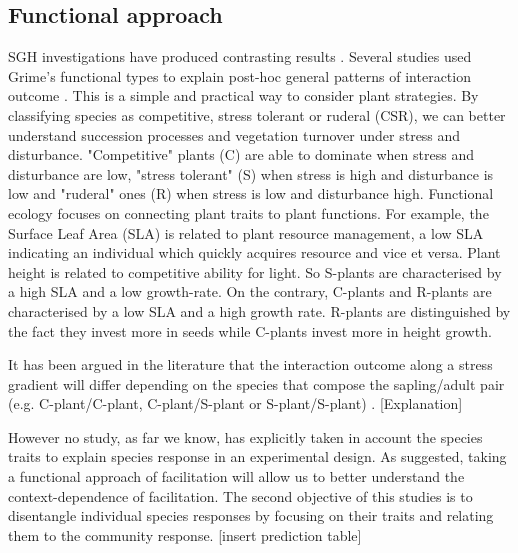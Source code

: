 \documentclass[12pt]{article} %
\begin{document}
\subsection{Functional approach}
SGH investigations have produced contrasting results \citep{Maestre2009}. Several studies used Grime's functional types to explain post-hoc general patterns of interaction outcome \citep{Maestre2009,Butterfield2013}. %
This is a simple and practical way to consider plant strategies. By classifying species as competitive, stress tolerant or ruderal (CSR), we can better understand succession processes \citep{Raevel2012} and vegetation turnover under stress and disturbance. "Competitive" plants (C) are able to dominate when stress and disturbance are low, "stress tolerant" (S) when stress is high and disturbance is low and "ruderal" ones (R) when stress is low and disturbance high.%
 Functional ecology focuses on connecting plant traits to plant functions. For example, the Surface Leaf Area (SLA) is related to plant resource management, a low SLA indicating an individual which quickly acquires resource and vice et versa. Plant height is related to competitive ability for light. So S-plants are characterised by a high SLA and a low growth-rate. On the contrary, C-plants and R-plants are characterised by a low SLA and a high growth rate. R-plants are distinguished by the fact they invest more in seeds while C-plants invest more in height growth.

It has been argued in the literature that the interaction outcome along a stress gradient will differ depending on the species that compose the sapling/adult pair (e.g. C-plant/C-plant, C-plant/S-plant or S-plant/S-plant) \citep{Maestre2009}. [Explanation]

However no study, as far we know, has explicitly taken in account the species traits to explain species response in an experimental design. As \citet{Butterfield2013} suggested, taking a functional approach of facilitation will allow us to better understand the context-dependence of facilitation. The second objective of this studies is to disentangle individual species responses by focusing on their traits and relating them to the community response. 
[insert prediction table]
\end{document}
